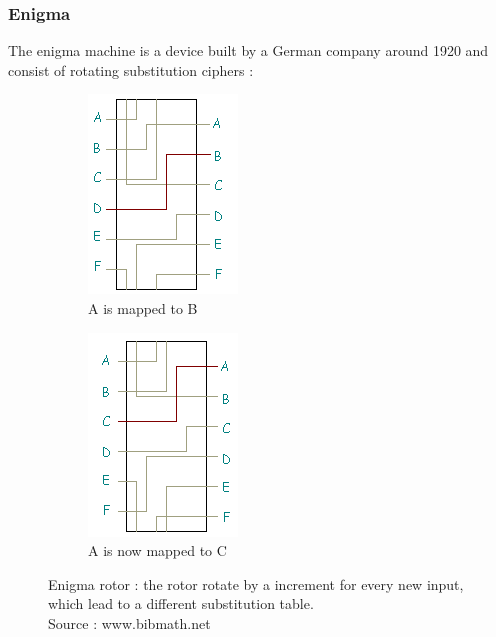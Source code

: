 \subsubsection{Enigma}

The enigma machine is a device built by a German company around 1920 and consist of rotating substitution ciphers : 

\begin{figure}[ht!]
        \centering
        \begin{subfigure}[b]{0.4\textwidth}
                \centering
                \includegraphics{images/enigma_rotor1}
                \caption{A is mapped to B}
                \label{fig:enigma_rotor1}
        \end{subfigure}
        \begin{subfigure}[b]{0.4\textwidth}
                \centering
                \includegraphics{images/enigma_rotor2}
                \caption{A is now mapped to C}
                \label{fig:enigma_rotor2}
        \end{subfigure}
        \caption{Enigma rotor : the rotor rotate by a increment for every new input, which lead to a different substitution table. \\ Source : www.bibmath.net }\label{fig:enigma_rotors}
\end{figure}

